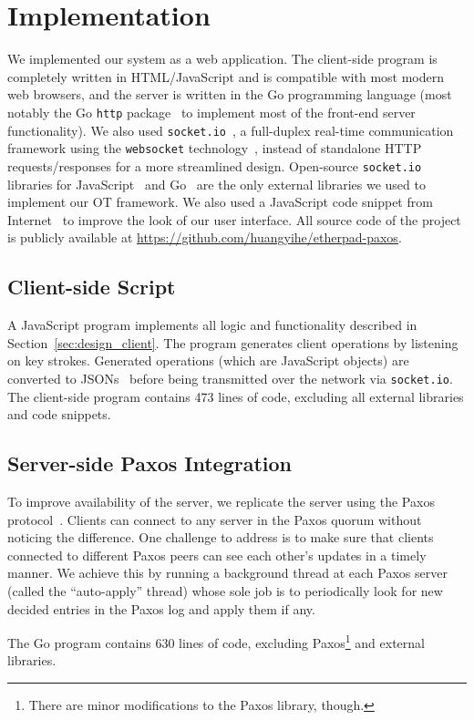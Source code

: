 \section{Implementation}

We implemented our system as a web application. The client-side program is
completely written in HTML/JavaScript and is compatible with most modern web
browsers, and the server is written in the Go programming language (most notably
the Go {\tt http} package~\cite{gohttp} to implement most of the front-end
server functionality). We also used {\tt socket.io}~\cite{socketio}, a full-duplex
real-time communication framework using the {\tt websocket}
technology~\cite{websock}, instead of standalone HTTP requests/responses for a
more streamlined design. Open-source {\tt socket.io} libraries for
JavaScript~\cite{jssocketio} and Go~\cite{gosocketio} are the only external
libraries we used to implement our OT framework. We also used a JavaScript code
snippet from Internet~\cite{linenumber} to improve the look of our user
interface. All source code of the project is publicly available at
\url{https://github.com/huangyihe/etherpad-paxos}.

\subsection{Client-side Script}

A JavaScript program implements all logic and functionality described in
Section~\ref{sec:design_client}. The program generates client operations by
listening on key strokes. Generated operations (which are JavaScript objects)
are converted to JSONs~\cite{json} before being transmitted over the network via
{\tt socket.io}. The client-side program contains 473 lines of code, excluding
all external libraries and code snippets.

\subsection{Server-side Paxos Integration}

To improve availability of the server, we replicate the server using the Paxos
protocol~\cite{lamport1998part}. Clients can connect to any server in the Paxos
quorum without noticing the difference. One challenge to address is to make sure
that clients connected to different Paxos peers can see each other's updates in
a timely manner. We achieve this by running a background thread at each Paxos
server (called the ``auto-apply'' thread) whose sole job is to periodically look
for new decided entries in the Paxos log and apply them if any.

The Go program contains 630 lines of code, excluding Paxos\footnote{There are
minor modifications to the Paxos library, though.} and external libraries.
